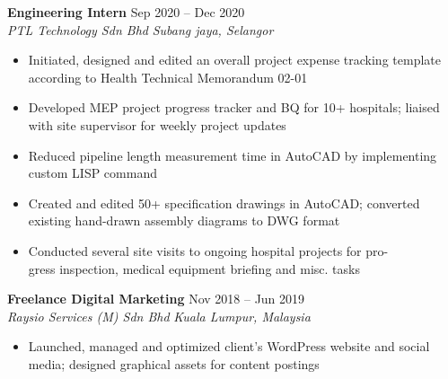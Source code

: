 \documentclass[11pt,A4,english]{article}
\begin{document}
\begin{paracol}{2}
\begin{rightcolumn}
\begin{addmargin}[0em]{0em}
            {\bfseries Engineering Intern} \hfill{Sep 2020 -- Dec 2020}\\
            {\textit{PTL Technology Sdn Bhd}} \hfill \textit{Subang jaya, Selangor}\\
            \vspace{-.3cm}
            \begin{addmargin}[-.5em]{0em}
                \begin{itemize}
                \justifying
                \item Initiated, designed and edited an overall project expense tracking template according to Health Technical Memorandum 02-01
                \vspace{-.1cm}
                \item Developed MEP project progress tracker and BQ for 10+ hospitals; liaised with site supervisor for weekly project updates
                \vspace{-.1cm}
                \item Reduced pipeline length measurement time in AutoCAD by implementing custom LISP command 
                \vspace{-.1cm}
                \item Created and edited 50+ specification drawings in AutoCAD; converted existing hand-drawn assembly diagrams to DWG format
                
                \vspace{-.1cm}
                \item Conducted several site visits to ongoing hospital projects for pro- \\gress inspection, medical equipment briefing and misc. tasks
                \vspace{-.1cm}
                
                \end{itemize}
            \end{addmargin}
        \end{addmargin}
        
        \vspace{.4cm}
        
        \begin{addmargin}[0em]{0em}
        {\bfseries Freelance Digital Marketing} \hfill{Nov 2018 -- Jun 2019}\\
            {\textit{Raysio Services (M) Sdn Bhd}} \hfill \textit{Kuala Lumpur, Malaysia}\\
            \vspace{-.3cm}
            \begin{addmargin}[-.5em]{0em}
                \begin{itemize}
                \justifying
                \item Launched, managed and optimized client's WordPress website and social media; designed graphical assets for content postings
                

\end{itemize}
\end{addmargin}
\end{addmargin}
\end{rightcolumn}
\end{paracol}
\end{document}
